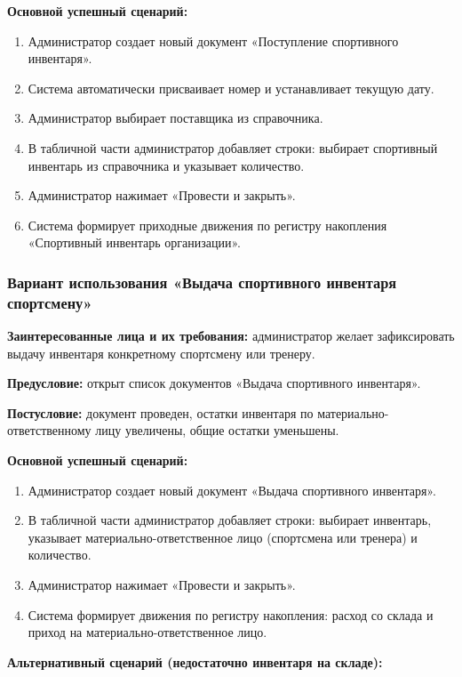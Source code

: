 \textbf{Основной успешный сценарий:}

\begin{enumerate}
	\item Администратор создает новый документ «Поступление спортивного инвентаря».
	\item Система автоматически присваивает номер и устанавливает текущую дату.
	\item Администратор выбирает поставщика из справочника.
	\item В табличной части администратор добавляет строки: выбирает спортивный инвентарь из справочника и указывает количество.
	\item Администратор нажимает «Провести и закрыть».
	\item Система формирует приходные движения по регистру накопления «Спортивный инвентарь организации».
\end{enumerate}

\subsubsection{Вариант использования «Выдача спортивного инвентаря спортсмену»}

\textbf{Заинтересованные лица и их требования:} администратор желает зафиксировать выдачу инвентаря конкретному спортсмену или тренеру.

\textbf{Предусловие:} открыт список документов «Выдача спортивного инвентаря».

\textbf{Постусловие:} документ проведен, остатки инвентаря по материально-ответственному лицу увеличены, общие остатки уменьшены.

\textbf{Основной успешный сценарий:}

\begin{enumerate}
	\item Администратор создает новый документ «Выдача спортивного инвентаря».
	\item В табличной части администратор добавляет строки: выбирает инвентарь, указывает материально-ответственное лицо (спортсмена или тренера) и количество.
	\item Администратор нажимает «Провести и закрыть».
	\item Система формирует движения по регистру накопления: расход со склада и приход на материально-ответственное лицо.
\end{enumerate}

\textbf{Альтернативный сценарий (недостаточно инвентаря на складе):}

